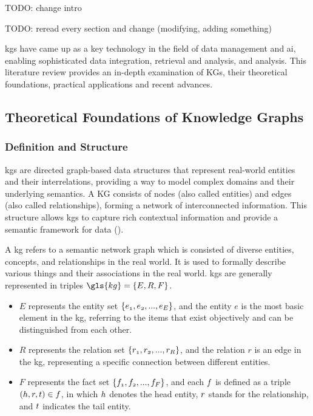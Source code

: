 TODO: change intro

TODO: reread every section and change (modifying, adding something)

\glspl{kg} have came up as a key technology in the field of data management and \gls{ai}, enabling sophisticated data integration, retrieval and analysis, and analysis. This literature review provides an in-depth examination of KGs, their theoretical foundations, practical applications and recent advances.
\subsection*{Theoretical Foundations of Knowledge Graphs}
\subsubsection*{Definition and Structure}
\glspl{kg} are directed graph-based data structures that represent real-world entities and their interrelations, providing a way to model complex domains and their underlying semantics. A KG consists of nodes (also called entities) and edges (also called relationships), forming a network of interconnected information. This structure allows \glspl{kg} to capture rich contextual information and provide a semantic framework for data (\cite{Hogan2021}).

A \gls{kg} refers to a semantic network graph which is consisted of diverse entities, concepts, and relationships in the real world. It is used to formally describe various things and their associations in the real world.
\glspl{kg} are generally represented in triples $\gls{kg}=\{\mathnormal{E,R,F}\}$.
\begin{itemize}
    \item $E$ represents the entity set $\{\mathnormal{e_1, e_2, ... ,e_E} \}$, and the entity $e$ is the most basic element in the \gls{kg}, referring to the items that exist objectively and can be distinguished from each other.
    \item $R$ represents the relation set $\{\mathnormal{r_1, r_2, ... ,r_R}\}$, and the relation $r$ is an edge in the \gls{kg}, representing a specific connection between different entities.
    \item $F$ represents the fact set $\{\mathnormal{f_1,f_2, ... ,f_F}\}$, and each $\mathnormal{f}$ is defined as a triple $(\mathnormal{h,r,t}) \in \mathnormal{f}$, in which $\mathnormal{h}$ denotes the head entity, $\mathnormal{r}$ stands for the relationship, and $\mathnormal{t}$ indicates the tail entity.
\end{itemize}

